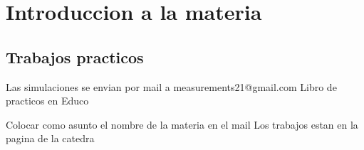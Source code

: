 \chapter*{Introduccion a la materia}
\section{Trabajos practicos}
Las simulaciones se envian por mail a measurements21@gmail.com
Libro de practicos en Educo

Colocar como asunto el nombre de la materia en el mail
Los trabajos estan en la pagina de la catedra
